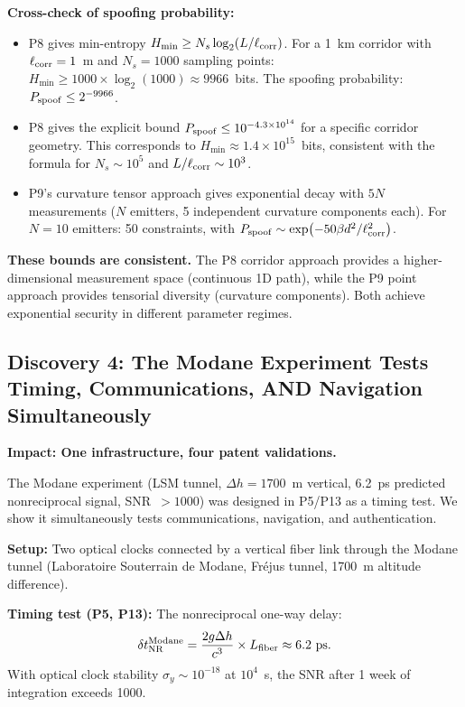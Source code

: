 \documentclass[aps,prd,twocolumn,superscriptaddress,nofootinbib]{revtex4-2}
\begin{document}
\textbf{Cross-check of spoofing probability:}
\begin{itemize}
\item P8 gives min-entropy $H_{\min} \geq N_s\log_2(L/\ell_{\rm corr})$.
For a 1~km corridor with $\ell_{\rm corr} = 1$~m and $N_s = 1000$
sampling points: $H_{\min} \geq 1000\times\log_2(1000) \approx 9966$~bits.
The spoofing probability: $P_{\rm spoof} \leq 2^{-9966}$.

\item P8 gives the explicit bound $P_{\rm spoof} \leq 10^{-4.3\times10^{14}}$
for a specific corridor geometry.  This corresponds to
$H_{\min} \approx 1.4\times10^{15}$~bits, consistent with the formula
for $N_s \sim 10^5$ and $L/\ell_{\rm corr} \sim 10^3$.

\item P9's curvature tensor approach gives exponential decay with
$5N$ measurements ($N$ emitters, 5 independent curvature components each).
For $N = 10$ emitters: 50 constraints, with
$P_{\rm spoof} \sim \exp(-50\beta d^2/\ell_{\rm corr}^2)$.
\end{itemize}

\textbf{These bounds are consistent.}  The P8 corridor approach provides
a higher-dimensional measurement space (continuous 1D path), while the P9
point approach provides tensorial diversity (curvature components).
Both achieve exponential security in different parameter regimes.

\subsection{Discovery 4: The Modane Experiment Tests Timing, Communications,
AND Navigation Simultaneously}

\textbf{Impact: One infrastructure, four patent validations.}

The Modane experiment (LSM tunnel, $\Delta h = 1700$~m vertical,
6.2~ps predicted nonreciprocal signal, SNR~$> 1000$) was designed
in P5/P13 as a timing test.  We show it simultaneously tests
communications, navigation, and authentication.

\textbf{Setup:} Two optical clocks connected by a vertical fiber link
through the Modane tunnel (Laboratoire Souterrain de Modane, Fr\'ejus
tunnel, 1700~m altitude difference).

\textbf{Timing test (P5, P13):}  The nonreciprocal one-way delay:
\begin{equation}
\delta t_{\rm NR}^{\rm Modane} = \frac{2g\Delta h}{c^3}\times L_{\rm fiber}
\approx 6.2~\text{ps}.
\end{equation}
With optical clock stability $\sigma_y \sim 10^{-18}$ at $10^4$~s,
the SNR after 1 week of integration exceeds 1000.
\end{document}
